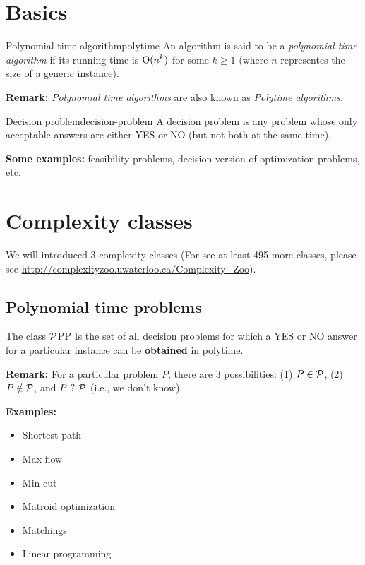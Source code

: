 \section{Basics}

\begin{definition}{Polynomial time algorithm}{polytime}
An algorithm is said to be a {\em polynomial time algorithm} if its running time is $\textup{O}(n^k)$ for some $k\geq 1$ (where $n$ representes the size of a generic instance).
\end{definition}

{\bf Remark:} {\em Polynomial time algorithms} are also known as  {\em Polytime algorithms}.

\begin{definition}{Decision problem}{decision-problem} 
A decision problem  is  any problem whose only acceptable answers are either YES or NO (but not both at the same time).
\end{definition}



{\bf Some examples:} feasibility problems, decision version of optimization problems, etc.

\section{Complexity classes}

We will introduced 3 complexity classes (For see at least 495 more classes, please see \url{http://complexityzoo.uwaterloo.ca/Complexity_Zoo}).

\subsection{Polynomial time problems} 
\begin{definition}{The class ${\mathcal{P}}$}{PP} 
Is the set of all decision problems for which a YES or NO answer for a  
particular instance can be {\bf obtained} in polytime.
\end{definition}

{\bf Remark:} For a particular problem $P$, there are 3 possibilities: (1) $P\in{\mathcal{P}}$, (2) $P\notin{\mathcal{P}}$, and $P\ \mbox{?}\ {\mathcal{P}}$ (i.e., we don't know). 

{\bf Examples:}

\begin{multicols}{2}
\begin{itemize}
	\item Shortest path
	\item Max flow
	\item Min cut
	\item Matroid optimization
	\item Matchings
	\item Linear programming
\end{itemize}
\end{multicols}

